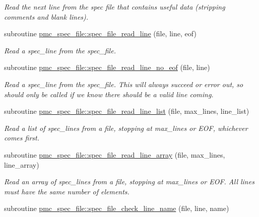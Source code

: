 \begin{DoxyCompactItemize}
\begin{DoxyCompactList}\small\item\em Read the next line from the spec file that contains useful data (stripping comments and blank lines). \end{DoxyCompactList}\item 
subroutine \mbox{\hyperlink{namespacepmc__spec__file_ae544104f5a2984285c893055469e264c}{pmc\+\_\+spec\+\_\+file\+::spec\+\_\+file\+\_\+read\+\_\+line}} (file, line, eof)
\begin{DoxyCompactList}\small\item\em Read a spec\+\_\+line from the spec\+\_\+file. \end{DoxyCompactList}\item 
subroutine \mbox{\hyperlink{namespacepmc__spec__file_a859907e4e40a0d2451a4d6d2c740f956}{pmc\+\_\+spec\+\_\+file\+::spec\+\_\+file\+\_\+read\+\_\+line\+\_\+no\+\_\+eof}} (file, line)
\begin{DoxyCompactList}\small\item\em Read a spec\+\_\+line from the spec\+\_\+file. This will always succeed or error out, so should only be called if we know there should be a valid line coming. \end{DoxyCompactList}\item 
subroutine \mbox{\hyperlink{namespacepmc__spec__file_aaf63e06c4ae6bef1b2417aadf81ae413}{pmc\+\_\+spec\+\_\+file\+::spec\+\_\+file\+\_\+read\+\_\+line\+\_\+list}} (file, max\+\_\+lines, line\+\_\+list)
\begin{DoxyCompactList}\small\item\em Read a list of spec\+\_\+lines from a file, stopping at max\+\_\+lines or E\+OF, whichever comes first. \end{DoxyCompactList}\item 
subroutine \mbox{\hyperlink{namespacepmc__spec__file_a68af556f3f33d455a7ff86d8fff1c660}{pmc\+\_\+spec\+\_\+file\+::spec\+\_\+file\+\_\+read\+\_\+line\+\_\+array}} (file, max\+\_\+lines, line\+\_\+array)
\begin{DoxyCompactList}\small\item\em Read an array of spec\+\_\+lines from a file, stopping at max\+\_\+lines or E\+OF. All lines must have the same number of elements. \end{DoxyCompactList}\item 
subroutine \mbox{\hyperlink{namespacepmc__spec__file_a4f11fc0e28f7b8831efcb65ef879bfc4}{pmc\+\_\+spec\+\_\+file\+::spec\+\_\+file\+\_\+check\+\_\+line\+\_\+name}} (file, line, name)

\end{DoxyCompactItemize}
